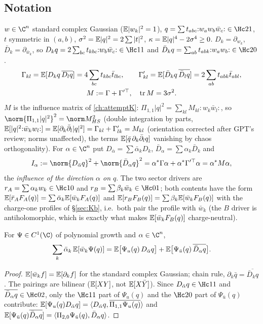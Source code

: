 \subsection{Notation}\label{sec:wct-notation}
$w\in\C^n$ standard complex Gaussian ($\mathbb E|w_k|^2=1$), $q=\sum t_{abc}{:}w_aw_b\bar w_c{:}\in\Hc21$, $t$ symmetric in $(a,b)$, $\sigma^2=\mathbb E|q|^2=2\sum|t|^2$,
$\kappa=\mathbb E|q|^4-2\sigma^4\ge0$. $D_k=\partial_{w_k}$, $\bar D_k=\partial_{\bar w_k}$, so $D_kq=2\sum_{bc}t_{kbc}{:}w_b\bar w_c{:}\in\Hc11$ and $\bar D_kq=\sum_{ab}t_{abk}{:}w_aw_b{:}\in\Hc20$.
\[\begin{gathered}
\Gamma_{kl}=\mathbb E[D_kq\,\overline{D_lq}]=4\sum_{bc}t_{kbc}\bar t_{lbc},\qquad \Gamma'_{kl}=\mathbb E[\bar D_kq\,\overline{\bar D_lq}]=2\sum_{ab}t_{abk}\bar t_{abl},\\
M:=\Gamma+\Gamma'^{\top},\quad \operatorname{tr}M=3\sigma^2 .
\end{gathered}\]
$M$ is the influence matrix of \autoref{ch:attemptK}: $\Pi_{1,1}|q|^2=\sum_{kl}M_{kl}{:}w_k\bar w_l{:}$, so $\norm{\Pi_{1,1}|q|^2}^2=\norm M_{HS}^2$ (double integration by parts,
$\mathbb E[|q|^2{:}\bar w_kw_l{:}]=\mathbb E[\partial_k\bar\partial_l|q|^2]=\Gamma_{kl}+\Gamma'_{lk}=M_{kl}$ (orientation corrected after GPT's review; norms unaffected), the terms $\mathbb E[\bar q\,\partial_k\bar\partial_lq]$ vanishing by chaos orthogonality).
For $\alpha\in\C^n$ put $D_{\bar\alpha}=\sum\bar\alpha_kD_k$, $\bar D_\alpha=\sum\alpha_k\bar D_k$ and
\[
I_\alpha:=\norm{D_{\bar\alpha}q}^2+\norm{\bar D_\alpha q}^2=\alpha^*\Gamma\alpha+\alpha^*\Gamma'^{\top}\alpha=\alpha^*M\alpha ,
\]
the \emph{influence of the direction $\alpha$ on $q$}. The two sector drivers are $r_A=\sum\alpha_kw_k\in\Hc10$ and $r_B=\sum\beta_k\bar w_k\in\Hc01$; both contents have the form
$\mathbb E[\bar r_AF_A(q)]=\sum\bar\alpha_k\mathbb E[\bar w_kF_A(q)]$ and $\mathbb E[r_BF_B(q)]=\sum\beta_k\mathbb E[\bar w_kF_B(q)]$ with the charge-one profiles of \S\ref{sec:Kb}, i.e.\ both pair the
profile with $\bar w_k$ (the $B$ driver is antiholomorphic, which is exactly what makes $\mathbb E[\bar w_kF_B(q)]$ charge-neutral).

\begin{lemma}\label{lem:ibp}
For $\Psi\in C^1(\C)$ of polynomial growth and $\alpha\in\C^n$,
\[
\sum_k\bar\alpha_k\,\mathbb E[\bar w_k\Psi(q)]=\mathbb E\bigl[\Psi_u(q)\,D_{\bar\alpha}q\bigr]+\mathbb E\bigl[\Psi_{\bar u}(q)\,\overline{\bar D_\alpha q}\bigr].
\]
\end{lemma}
\begin{proof}$\mathbb E[\bar w_kf]=\mathbb E[\partial_kf]$ for the standard complex Gaussian; chain rule, $\partial_k\bar q=\overline{\bar D_kq}$. The pairings are bilinear
($\mathbb E[XY]$, not $\mathbb E[X\bar Y]$). Since $D_{\bar\alpha}q\in\Hc11$ and $\overline{\bar D_\alpha q}\in\Hc02$, only the $\Hc11$ part of $\Psi_u(q)$ and the $\Hc20$ part of $\Psi_{\bar u}(q)$
contribute: $\mathbb E[\Psi_u(q)D_{\bar\alpha}q]=\langle D_{\bar\alpha}q,\overline{\Pi_{1,1}\Psi_u(q)}\rangle$ and $\mathbb E[\Psi_{\bar u}(q)\overline{\bar D_\alpha q}]=\langle\Pi_{2,0}\Psi_{\bar u}(q),\bar D_\alpha q\rangle$.
\end{proof}

